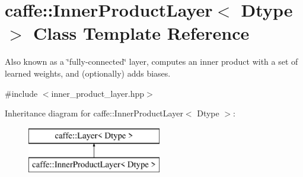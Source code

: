 \hypertarget{classcaffe_1_1InnerProductLayer}{}\section{caffe\+:\+:Inner\+Product\+Layer$<$ Dtype $>$ Class Template Reference}
\label{classcaffe_1_1InnerProductLayer}


Also known as a \char`\"{}fully-\/connected\char`\"{} layer, computes an inner product with a set of learned weights, and (optionally) adds biases.  




{\ttfamily \#include $<$inner\+\_\+product\+\_\+layer.\+hpp$>$}

Inheritance diagram for caffe\+:\+:Inner\+Product\+Layer$<$ Dtype $>$\+:\begin{figure}[H]
\begin{center}
\leavevmode
\includegraphics[height=2.000000cm]{classcaffe_1_1InnerProductLayer}
\end{center}
\end{figure}
